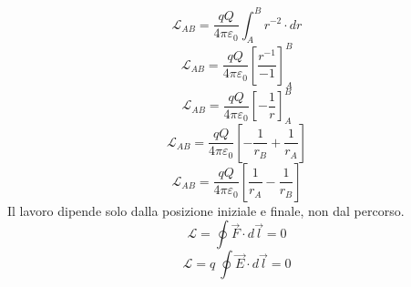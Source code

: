 \documentclass[twoside]{article}
\begin{document}
\begin{equation*}
    \mathcal{L}_{AB} = \frac{qQ}{4\pi \varepsilon_0} \displaystyle \int_{A}^{B} r^{-2} \cdot dr
\end{equation*}
\begin{equation*}
    \mathcal{L}_{AB} = \frac{qQ}{4\pi \varepsilon_0} \displaystyle \left[\frac{r^{-1}}{-1} \right]_{A}^{B}
\end{equation*}
\begin{equation*}
    \mathcal{L}_{AB} = \frac{qQ}{4\pi \varepsilon_0} \displaystyle \left[-\frac{1}{r} \right]_{A}^{B}
\end{equation*}
\begin{equation*}
    \mathcal{L}_{AB} = \frac{qQ}{4\pi \varepsilon_0} \displaystyle\left[ -\frac{1}{r_{B}} + \frac{1}{r_{A}}\right]
\end{equation*}
\begin{equation*}
    \mathcal{L}_{AB} = \frac{qQ}{4\pi \varepsilon_0} \displaystyle\left[ \frac{1}{r_{A}} - \frac{1}{r_{B}}\right]
\end{equation*}
Il lavoro dipende solo dalla posizione iniziale e finale, non dal percorso.\\
\begin{equation}
    \boxed{\mathcal{L} = \oint \vec{F} \cdot d\vec{l} = 0}
\end{equation}
\begin{equation}
    \boxed{\mathcal{L} = q\ \oint \vec{E} \cdot d\vec{l} = 0}
\end{equation}
\end{document}

